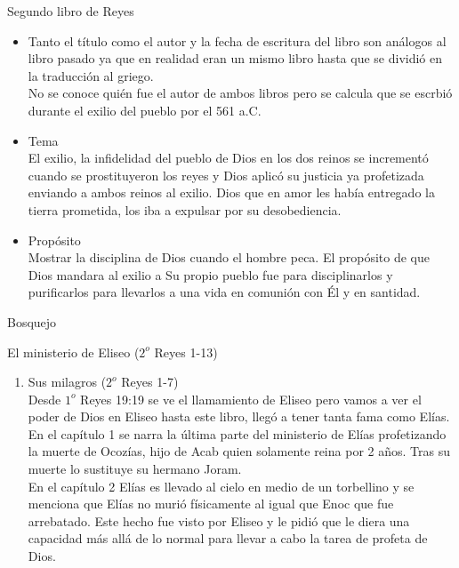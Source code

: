 %
%
\begin{section}{Segundo libro de Reyes}
	\begin{itemize}
		\item Tanto el título como el autor y la fecha de escritura del libro son análogos al libro pasado ya que en realidad eran un mismo libro hasta que se dividió en la traducción al griego.\\
			No se conoce quién fue el autor de ambos libros pero se calcula que se escrbió durante el exilio del pueblo por el 561 a.C.
		\item Tema\\
			El exilio, la infidelidad del pueblo de Dios en los dos reinos se incrementó cuando se prostituyeron los reyes y Dios aplicó su justicia ya profetizada enviando a ambos reinos al exilio. Dios que en amor les había entregado la tierra prometida, los iba a expulsar por su desobediencia.
		\item Propósito\\
			Mostrar la disciplina de Dios cuando el hombre peca. El propósito de que Dios mandara al exilio a Su propio pueblo fue para disciplinarlos y purificarlos para llevarlos a una vida en comunión con Él y en santidad.
	\end{itemize}
	\begin{subsection}{Bosquejo}
		\begin{subsubsection}{El ministerio de Eliseo ($2^{o}$ Reyes 1-13)}
			\begin{enumerate}
				\item Sus milagros ($2^{o}$ Reyes 1-7)\\
					Desde $1^{o}$ Reyes 19:19 se ve el llamamiento de Eliseo pero vamos a ver el poder de Dios en Eliseo hasta este libro, llegó a tener tanta fama como Elías. En el capítulo 1 se narra la última parte del ministerio de Elías profetizando la muerte de Ocozías, hijo de Acab quien solamente reina por 2 años. Tras su muerte lo sustituye su hermano Joram.\\
					En el capítulo 2 Elías es llevado al cielo en medio de un torbellino y se menciona que Elías no murió físicamente al igual que Enoc que fue arrebatado. Este hecho fue visto por Eliseo y le pidió que le diera una capacidad más allá de lo normal para llevar a cabo la tarea de profeta de Dios. \\

\end{enumerate}
\end{subsubsection}
\end{subsection}
\end{section}
